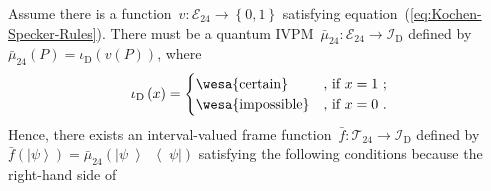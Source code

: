 \documentclass[english,reprint, aps, prl,superscriptaddress, showpacs,
showkeys, longbibliography]{revtex4-1}
\theoremstyle{plain}
\theoremstyle{definition}
\newcommand{\events}{\ensuremath{\mathcal{E}}}
\newcommand{\imposs}{{\mbox{\wesa{impossible}}}}
\newcommand{\necess}{{\mbox{\wesa{certain}}}}
\newcommand{\ket}[1]{{\left\vert{#1}\right\rangle}}
\newcommand{\op}[2]{\ensuremath{\left\vert{#1}\middle\rangle\middle\langle{#2}\right\vert}}
\newcommand{\proj}[1]{\op{#1}{#1}}
\begin{document}
Assume there is a function~$v:\events_{24}\rightarrow\left\{ 0,1\right\} $
satisfying equation~(\ref{eq:Kochen-Specker-Rules}). There must
be a quantum IVPM~$\bar{\mu}_{24}:\events_{24}\rightarrow\mathscr{I}_{\mathrm{D}}$
defined by $\bar{\mu}_{24}\left(P\right)=\iota_{\mathrm{D}}\left(v\left(P\right)\right)$,
where 
\begin{equation}
\iota_{\mathrm{D}}\left(x\right)=\begin{cases}
\necess & \text{, if }x=1\text{ ;}\\
\imposs & \text{, if }x=0\text{ .}
\end{cases}\label{eq:homomorphism-0}
\end{equation}
Hence, there exists an interval-valued frame function~$\bar{f}:\mathcal{T}_{24}\rightarrow\mathscr{I}_{\mathrm{D}}$
defined by $\bar{f}\left(\ket{\psi}\right)=\bar{\mu}_{24}\left(\proj{\psi}\right)$
satisfying the following conditions because the right-hand side of
\end{document}
